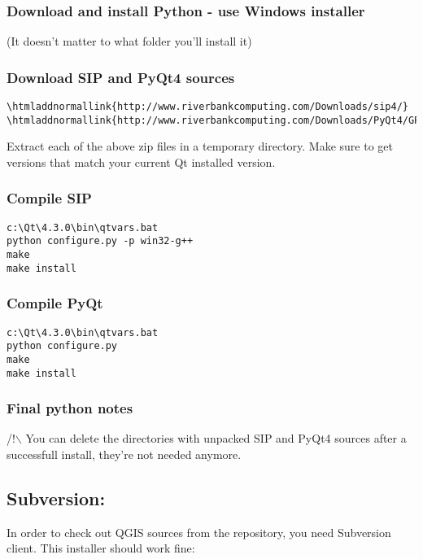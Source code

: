 \subsubsection{Download and install Python - use Windows installer}
(It doesn't matter to what folder you'll install it)


\subsubsection{Download SIP and PyQt4 sources}

\begin{verbatim}
\htmladdnormallink{http://www.riverbankcomputing.com/Downloads/sip4/}
\htmladdnormallink{http://www.riverbankcomputing.com/Downloads/PyQt4/GPL/}
\end{verbatim}

Extract each of the above zip files in a temporary directory. Make sure
to get versions that match your current Qt installed version.

\subsubsection{Compile SIP}
\begin{verbatim}
c:\Qt\4.3.0\bin\qtvars.bat 
python configure.py -p win32-g++ 
make 
make install 
\end{verbatim}

\subsubsection{Compile PyQt}
\begin{verbatim}
c:\Qt\4.3.0\bin\qtvars.bat 
python configure.py 
make 
make install 
\end{verbatim}

\subsubsection{Final python notes}
/!$\backslash$ You can delete the directories with unpacked SIP and PyQt4 sources after a
successfull install, they're not needed anymore.

\subsection{Subversion:}
In order to check out QGIS sources from the repository, you need Subversion
client. This installer should work fine:

